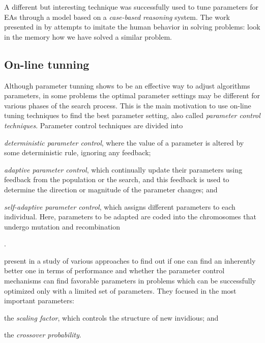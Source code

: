 A different but interesting technique was successfully used to tune parameters for EAs through a model based on a {\it case-based reasoning} system. The work presented in \cite{Yeguas2014} by  attempts to imitate the human behavior in solving problems: look in the memory how we have solved a similar problem.

\subsection{On-line tunning}

Although parameter tunning shows to be an effective way to adjust algorithms parameters, in some problems the optimal parameter settings may be different for various phases of the search process. This is the main motivation to use on-line tuning techniques to find the best parameter setting, also called \textit{parameter control techniques}. Parameter control techniques are divided into 
\begin{inparaenum}[i)]
\item \textit{deterministic parameter control}, where the value of a parameter is altered by some deterministic rule, ignoring any feedback; 
\item \textit{adaptive parameter control}, which continually update their parameters using feedback from the population or the search, and this feedback is used to determine the direction or magnitude of the parameter changes; and 
\item \textit{self-adaptive parameter control}, which assigns different parameters to each individual. Here, parameters to be adapted are coded into the chromosomes that undergo mutation and recombination
\end{inparaenum}\cite{Eiben1999}.

 present in \cite{Drozdik} a study of various approaches to find out if one can find an inherently better one in terms of performance and whether the parameter control mechanisms can find favorable parameters in problems which can be successfully optimized only with a limited set of parameters. They focused in the most important parameters: 
\begin{inparaenum}[i)]
\item the \textit{scaling factor}, which controls the structure of new invidious; and
\item the \textit{crossover probability}.
\end{inparaenum}

